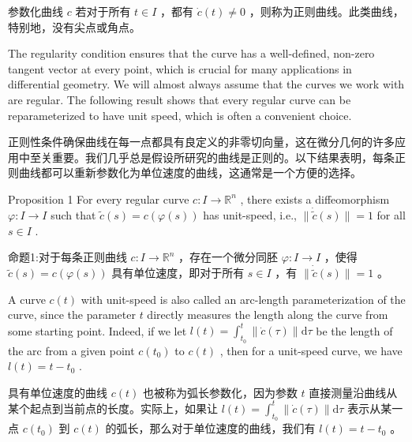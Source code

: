 \begin{tcolorbox}
参数化曲线 \(c\) 若对于所有 \(t \in  I\) ，都有 \(\dot{c}\left( t\right)  \neq  0\) ，则称为正则曲线。此类曲线，特别地，没有尖点或角点。
\end{tcolorbox}

The regularity condition ensures that the curve has a well-defined, non-zero tangent vector at every point, which is crucial for many applications in differential geometry. We will almost always assume that the curves we work with are regular. The following result shows that every regular curve can be reparameterized to have unit speed, which is often a convenient choice.

\begin{tcolorbox}
正则性条件确保曲线在每一点都具有良定义的非零切向量，这在微分几何的许多应用中至关重要。我们几乎总是假设所研究的曲线是正则的。以下结果表明，每条正则曲线都可以重新参数化为单位速度的曲线，这通常是一个方便的选择。
\end{tcolorbox}

Proposition 1 For every regular curve \(c : I \rightarrow  {\mathbb{R}}^{n}\) , there exists a diffeomorphism \(\varphi  : I \rightarrow  I\) such that \(\widetilde{c}\left( s\right)  = c\left( {\varphi \left( s\right) }\right)\) has unit-speed, i.e., \(\parallel \dot{\widetilde{c}}\left( s\right) \parallel  = 1\) for all \(s \in  I\) .

\begin{tcolorbox}
命题1:对于每条正则曲线 \(c : I \rightarrow  {\mathbb{R}}^{n}\) ，存在一个微分同胚 \(\varphi  : I \rightarrow  I\) ，使得 \(\widetilde{c}\left( s\right)  = c\left( {\varphi \left( s\right) }\right)\) 具有单位速度，即对于所有 \(s \in  I\) ，有 \(\parallel \dot{\widetilde{c}}\left( s\right) \parallel  = 1\) 。
\end{tcolorbox}

A curve \(c\left( t\right)\) with unit-speed is also called an arc-length parameterization of the curve, since the parameter \(t\) directly measures the length along the curve from some starting point. Indeed, if we let \(l\left( t\right)  = {\int }_{{t}_{0}}^{t}\parallel \dot{c}\left( \tau \right) \parallel \mathrm{d}\tau\) be the length of the arc from a given point \(c\left( {t}_{0}\right)\) to \(c\left( t\right)\) , then for a unit-speed curve, we have \(l\left( t\right)  = t - {t}_{0}\) .

\begin{tcolorbox}
具有单位速度的曲线 \(c\left( t\right)\) 也被称为弧长参数化，因为参数 \(t\) 直接测量沿曲线从某个起点到当前点的长度。实际上，如果让 \(l\left( t\right)  = {\int }_{{t}_{0}}^{t}\parallel \dot{c}\left( \tau \right) \parallel \mathrm{d}\tau\) 表示从某一点 \(c\left( {t}_{0}\right)\) 到 \(c\left( t\right)\) 的弧长，那么对于单位速度的曲线，我们有 \(l\left( t\right)  = t - {t}_{0}\) 。
\end{tcolorbox}

